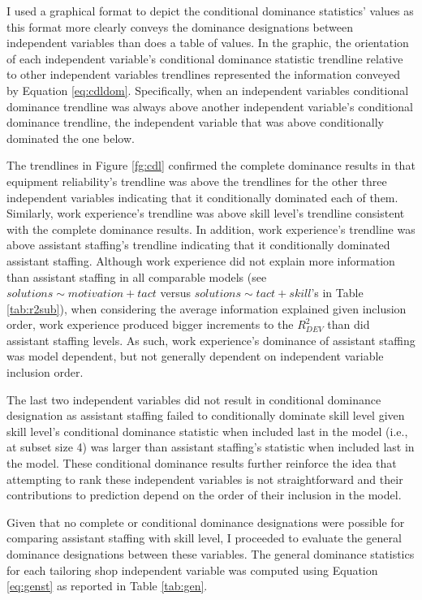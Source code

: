 \documentclass[man]{apa7}
\begin{document}
	I used a graphical format to depict the conditional dominance statistics' values as this format more clearly conveys the dominance designations between independent variables than does a table of values. 
	In the graphic, the orientation of each independent variable's conditional dominance statistic trendline relative to other independent variables trendlines represented the information conveyed by Equation \ref{eq:cdldom}.
	Specifically, when an independent variables conditional dominance trendline was always above another independent variable's conditional dominance trendline, the independent variable that was above conditionally dominated the one below.
	
	The trendlines in Figure \ref{fg:cdl} confirmed the complete dominance results in that equipment reliability's trendline was above the trendlines for the other three independent variables indicating that it conditionally dominated each of them.
	Similarly, work experience's trendline was above skill level's trendline consistent with the complete dominance results.
	In addition, work experience's trendline was above assistant staffing's trendline indicating that it conditionally dominated assistant staffing.
	Although work experience did not explain more information than assistant staffing in all comparable models (see $solutions \sim motivation + tact$ versus $solutions \sim tact + skill$'s in Table \ref{tab:r2sub}), when considering the average information explained given inclusion order, work experience produced bigger increments to the $R^2_{DEV}$ than did assistant staffing levels. 
	As such, work experience's dominance of assistant staffing was model dependent, but not generally dependent on independent variable inclusion order.
	
	The last two independent variables did not result in conditional dominance designation as assistant staffing failed to conditionally dominate skill level given skill level's conditional dominance statistic when included last in the model (i.e., at subset size 4) was larger than assistant staffing's statistic when included last in the model.
	These conditional dominance results further reinforce the idea that attempting to rank these independent variables is not straightforward and their contributions to prediction depend on the order of their inclusion in the model. 
	
	Given that no complete or conditional dominance designations were possible for comparing assistant staffing with skill level, I proceeded to evaluate the general dominance designations between these variables. 
	The general dominance statistics for each tailoring shop independent variable was computed using Equation \ref{eq:genst} as reported in Table \ref{tab:gen}.
	
\end{document}
